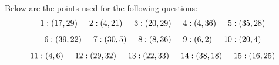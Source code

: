 \newpage
{}

  Below are the points used for the following questions:
\[
1: (17, 29) \hspace{5mm}
2: (4, 21) \hspace{5mm}
3: (20, 29) \hspace{5mm}
4: (4, 36) \hspace{5mm}
5: (35, 28)
\]
\[
6: (39, 22) \hspace{5mm}
7: (30, 5) \hspace{5mm}
8: (8, 36) \hspace{5mm}
9: (6, 2) \hspace{5mm}
10: (20, 4)
\]
\[
11: (4, 6) \hspace{5mm}
12: (29, 32) \hspace{5mm}
13: (22, 33) \hspace{5mm}
14: (38, 18) \hspace{5mm}
15: (16, 25)
\]

